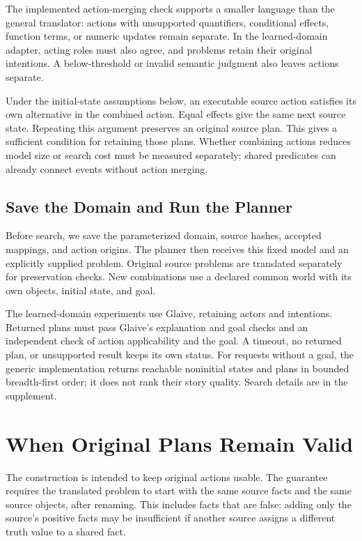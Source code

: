 \documentclass[letterpaper]{article}
\begin{document}
The implemented action-merging check supports a smaller language than the general translator: actions with unsupported quantifiers, conditional effects, function terms, or numeric updates remain separate. In the learned-domain adapter, acting roles must also agree, and problems retain their original intentions. A below-threshold or invalid semantic judgment also leaves actions separate.

Under the initial-state assumptions below, an executable source action satisfies its own alternative in the combined action. Equal effects give the same next source state. Repeating this argument preserves an original source plan. This gives a sufficient condition for retaining those plans. Whether combining actions reduces model size or search cost must be measured separately; shared predicates can already connect events without action merging.

\subsection{Save the Domain and Run the Planner}
Before search, we save the parameterized domain, source hashes, accepted mappings, and action origins. The planner then receives this fixed model and an explicitly supplied problem. Original source problems are translated separately for preservation checks. New combinations use a declared common world with its own objects, initial state, and goal.

The learned-domain experiments use Glaive, retaining actors and intentions. Returned plans must pass Glaive's explanation and goal checks and an independent check of action applicability and the goal. A timeout, no returned plan, or unsupported result keeps its own status. For requests without a goal, the generic implementation returns reachable noninitial states and plans in bounded breadth-first order; it does not rank their story quality. Search details are in the supplement.

\section{When Original Plans Remain Valid}
The construction is intended to keep original actions usable. The guarantee requires the translated problem to start with the same source facts and the same source objects, after renaming. This includes facts that are false: adding only the source's positive facts may be insufficient if another source assigns a different truth value to a shared fact.
\end{document}
